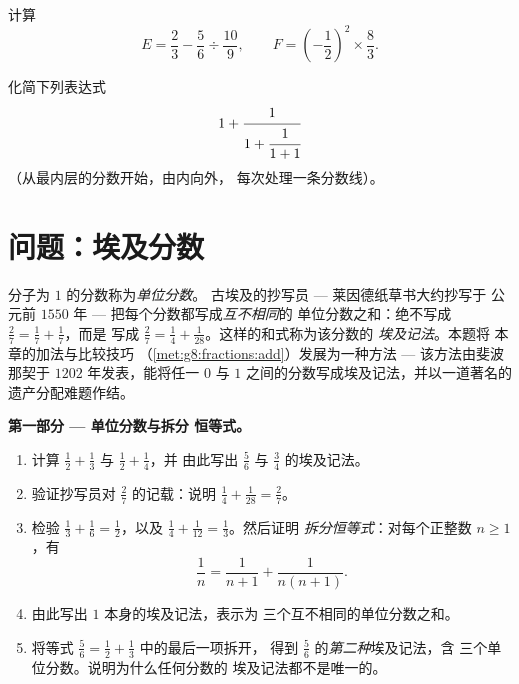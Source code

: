 \begin{exercise}[$\star\star$]\label{exo:g8:fractions:11}
计算
\[
E = \frac{2}{3} - \frac{5}{6} \div \frac{10}{9},
\qquad
F = \left(-\frac{1}{2}\right)^2 \times \frac{8}{3} .
\]
\end{exercise}

\begin{exercise}[$\star\star\star$]\label{exo:g8:fractions:12}
化简下列表达式
\[
1 + \cfrac{1}{1 + \cfrac{1}{1 + 1}}
\]
（从最内层的分数开始，由内向外，
每次处理一条分数线）。
\end{exercise}

\section{问题：埃及分数}

\begin{problem}
\label{pb:g8:fractions:1}
分子为 $1$ 的分数称为\emph{单位分数}。
古埃及的抄写员 --- 莱因德纸草书大约抄写于
公元前 $1550$ 年 --- 把每个分数都写成\emph{互不相同}的
单位分数之和：绝不写成 $\frac27 = \frac17 + \frac17$，而是
写成 $\frac27 = \frac14 + \frac{1}{28}$。这样的和式称为该分数的
\emph{埃及记法}。本题将
本章的加法与比较技巧
（\cref{met:g8:fractions:add}）发展为一种方法 --- 该方法由斐波那契于
$1202$ 年发表，能将任一
$0$ 与 $1$ 之间的分数写成埃及记法，并以一道著名的
遗产分配难题作结。

\medskip
\noindent\textbf{第一部分 --- 单位分数与拆分
恒等式。}
\begin{enumerate}
  \item 计算 $\frac12 + \frac13$ 与 $\frac12 + \frac14$，并
        由此写出 $\frac56$ 与 $\frac34$ 的埃及记法。
  \item 验证抄写员对 $\frac27$ 的记载：说明
        $\frac14 + \frac{1}{28} = \frac27$。
  \item 检验 $\frac13 + \frac16 = \frac12$，以及
        $\frac14 + \frac{1}{12} = \frac13$。然后证明
        \emph{拆分恒等式}：对每个正整数
        $n \geq 1$，有
        \[
        \frac{1}{n} = \frac{1}{n+1} + \frac{1}{n(n+1)} .
        \]
  \item 由此写出 $1$ 本身的埃及记法，表示为
        三个互不相同的单位分数之和。
  \item 将等式 $\frac56 = \frac12 + \frac13$ 中的最后一项拆开，
        得到 $\frac56$ 的\emph{第二种}埃及记法，含
        三个单位分数。说明为什么任何分数的
        埃及记法都不是唯一的。
\end{enumerate}


\end{problem}
